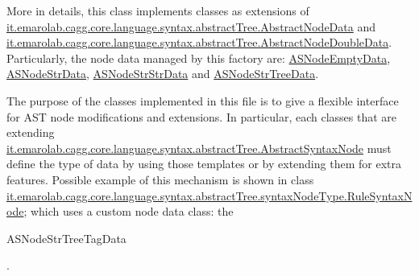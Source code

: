 More in details, this class implements classes as extensions of \hyperlink{}{it.\-emarolab.\-cagg.\-core.\-language.\-syntax.\-abstract\-Tree.\-Abstract\-Node\-Data} and \hyperlink{}{it.\-emarolab.\-cagg.\-core.\-language.\-syntax.\-abstract\-Tree.\-Abstract\-Node\-Double\-Data}. Particularly, the node data managed by this factory are\-: \hyperlink{classit_1_1emarolab_1_1cagg_1_1core_1_1language_1_1syntax_1_1abstractTree_1_1AbstractDataFactory_1_1ASNodeEmptyData}{A\-S\-Node\-Empty\-Data}, \hyperlink{classit_1_1emarolab_1_1cagg_1_1core_1_1language_1_1syntax_1_1abstractTree_1_1AbstractDataFactory_1_1ASNodeStrData}{A\-S\-Node\-Str\-Data}, \hyperlink{classit_1_1emarolab_1_1cagg_1_1core_1_1language_1_1syntax_1_1abstractTree_1_1AbstractDataFactory_1_1ASNodeStrStrData}{A\-S\-Node\-Str\-Str\-Data} and \hyperlink{classit_1_1emarolab_1_1cagg_1_1core_1_1language_1_1syntax_1_1abstractTree_1_1AbstractDataFactory_1_1ASNodeStrTreeData}{A\-S\-Node\-Str\-Tree\-Data}.\par


The purpose of the classes implemented in this file is to give a flexible interface for A\-S\-T node modifications and extensions. In particular, each classes that are extending \hyperlink{}{it.\-emarolab.\-cagg.\-core.\-language.\-syntax.\-abstract\-Tree.\-Abstract\-Syntax\-Node} must define the type of data by using those templates or by extending them for extra features. Possible example of this mechanism is shown in class \hyperlink{classit_1_1emarolab_1_1cagg_1_1core_1_1language_1_1syntax_1_1abstractTree_1_1syntaxNodeType_1_1RuleSyntaxNode}{it.\-emarolab.\-cagg.\-core.\-language.\-syntax.\-abstract\-Tree.\-syntax\-Node\-Type.\-Rule\-Syntax\-Node}; which uses a custom node data class\-: the
\begin{DoxyCode}
ASNodeStrTreeTagData 
\end{DoxyCode}
 . 

